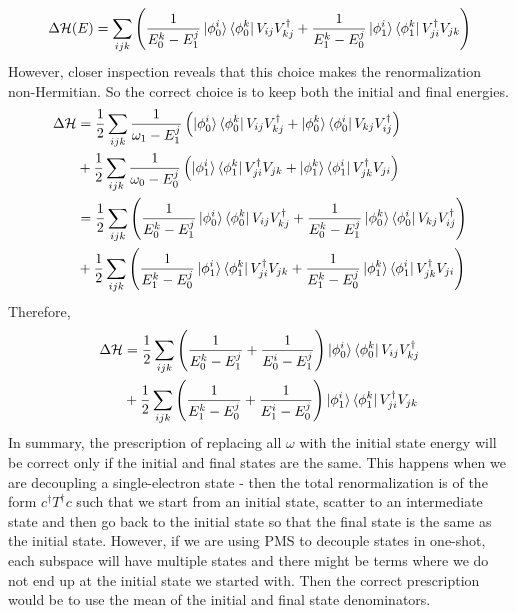 \documentclass[twoside,11pt]{report}
\numberwithin{equation}{section}
\begin{document}
\begin{equation}\begin{aligned}
	\Delta \mathcal{H}(E) = \sum_{ijk}\left(\frac{1}{E_0^k - E^j_1}\ket{\phi_0^i}\bra{\phi_0^k}V_{ij}V^\dagger_{kj} + \frac{1}{E_1^k - E^j_0}\ket{\phi_1^i}\bra{\phi_1^k}V^\dagger_{ji}V_{jk}\right)
\end{aligned}\end{equation}
However, closer inspection reveals that this choice makes the renormalization non-Hermitian. So the correct choice is to keep both the initial and final energies.
\begin{equation}\begin{aligned}
	\Delta \mathcal{H} &= \frac{1}{2}\sum_{ijk}\frac{1}{\omega_1 - E^j_1}\left(\ket{\phi_0^i}\bra{\phi_0^k}V_{ij}V^\dagger_{kj} + \ket{\phi_0^k}\bra{\phi_0^i}V_{kj}V^\dagger_{ij}\right)\\
			   &+\frac{1}{2}\sum_{ijk}\frac{1}{\omega_0 - E^j_0}\left(\ket{\phi_1^i}\bra{\phi_1^k}V^\dagger_{ji}V_{jk} + \ket{\phi_1^k}\bra{\phi_1^i}V^\dagger_{jk}V_{ji}\right)\\
			   &= \frac{1}{2}\sum_{ijk}\left(\frac{1}{E_0^k - E^j_1}\ket{\phi_0^i}\bra{\phi_0^k}V_{ij}V^\dagger_{kj} + \frac{1}{E_0^k - E^j_1}\ket{\phi_0^k}\bra{\phi_0^i}V_{kj}V^\dagger_{ij}\right)\\
			   &+\frac{1}{2}\sum_{ijk}\left(\frac{1}{E_1^k - E^j_0}\ket{\phi_1^i}\bra{\phi_1^k}V^\dagger_{ji}V_{jk} + \frac{1}{E_1^k - E^j_0}\ket{\phi_1^k}\bra{\phi_1^i}V^\dagger_{jk}V_{ji}\right)
\end{aligned}\end{equation}
Therefore,
\begin{equation}\begin{aligned}
	\label{pmsren}
	\Delta \mathcal{H} &= \frac{1}{2}\sum_{ijk}\left(\frac{1}{E_0^k - E^j_1} + \frac{1}{E_0^i - E^j_1}\right)\ket{\phi_0^i}\bra{\phi_0^k}V_{ij}V^\dagger_{kj}\\
			   &+\frac{1}{2}\sum_{ijk}\left(\frac{1}{E_1^k - E^j_0}+ \frac{1}{E_1^i - E^j_0}\right)\ket{\phi_1^i}\bra{\phi_1^k}V^\dagger_{ji}V_{jk}\\
\end{aligned}\end{equation}
In summary, the prescription of replacing all \(\omega\) with the initial state energy will be correct only if the initial and final states are the same. This happens when we are decoupling a single-electron state - then the total renormalization is of the form \(c^\dagger T^\dagger c\) such that we start from an initial state, scatter to an intermediate state and then go back to the initial state so that the final state is the same as the initial state. However, if we are using PMS to decouple states in one-shot, each subspace will have multiple states and there might be terms where we do not end up at the initial state we started with. Then the correct prescription would be to use the mean of the initial and final state denominators.
\end{document}

